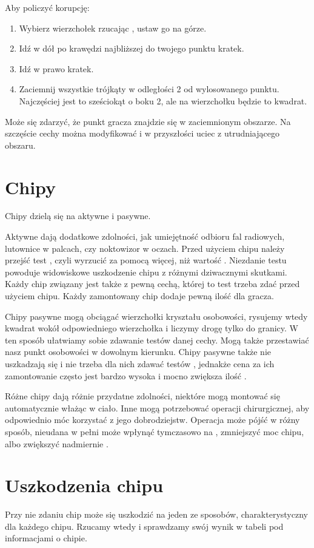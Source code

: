 Aby policzyć korupcję:
\begin{enumerate}
 \item Wybierz wierzchołek rzucając \dvi{}, ustaw go na górze.
 \item Idź w dół po krawędzi najbliższej do twojego punktu \dxx{} kratek.
 \item Idź w prawo \dxx[2]{} kratek.
 \item Zaciemnij wszystkie trójkąty w odległości 2 od wylosowanego punktu. Najczęściej jest to sześciokąt o boku 2, ale na wierzchołku będzie to kwadrat.
\end{enumerate}
Może się zdarzyć, że punkt gracza znajdzie się w zaciemnionym obszarze. 
Na szczęście cechy można modyfikować i w przyszłości uciec z utrudniającego obszaru.

\section{Chipy}
Chipy dzielą się na aktywne i pasywne.

Aktywne dają dodatkowe zdolności, jak umiejętność odbioru fal radiowych, lutownice w palcach, czy noktowizor w oczach.
Przed użyciem chipu należy przejść test \abnkp{}, czyli wyrzucić za pomocą \dxx{} więcej, niż wartość \abnkp{}. 
Niezdanie testu \abnkp{} powoduje widowiskowe uszkodzenie chipu z różnymi dziwacznymi skutkami.
Każdy chip związany jest także z pewną cechą, której to test trzeba zdać przed użyciem chipu.
Każdy zamontowany chip dodaje pewną ilość \abnkp{} dla gracza.

Chipy pasywne mogą obciągać wierzchołki kryształu osobowości, rysujemy wtedy kwadrat wokół odpowiedniego wierzchołka i liczymy drogę tylko do granicy.
W ten sposób ułatwiamy sobie zdawanie testów danej cechy.
Mogą także przestawiać nasz punkt osobowości w dowolnym kierunku.
Chipy pasywne także nie uszkadzają się i nie trzeba dla nich zdawać testów \abnkp{}, jednakże cena za ich zamontowanie często jest bardzo wysoka i mocno zwiększa ilość \abnkp{}.

Różne chipy dają różnie przydatne zdolności, niektóre mogą montować się automatycznie włażąc w ciało.
Inne mogą potrzebować operacji chirurgicznej, aby odpowiednio móc korzystać z jego dobrodziejstw.
Operacja może pójść w różny sposób, nieudana w pełni może wpłynąć tymczasowo na \abzyc{}, zmniejszyć moc chipu, albo zwiększyć nadmiernie \abnkp{}.

\section{Uszkodzenia chipu}
Przy nie zdaniu \abnkp{} chip może się uszkodzić na jeden ze sposobów, charakterystyczny dla każdego chipu.
Rzucamy wtedy \dxx{} i sprawdzamy swój wynik w tabeli pod informacjami o chipie.

